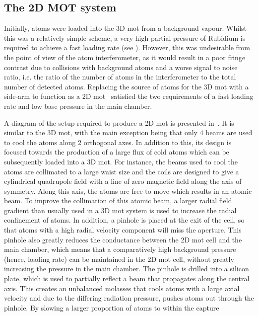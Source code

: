 \subsection{The 2D MOT system}\label{sec:2d_mot}
Initially, atoms were loaded into the 3D \ac{mot} from a background vapour.
Whilst this was a relatively simple scheme, a very high partial pressure of
Rubidium is required to achieve a fast loading rate (see
). However, this was undesirable from the
point of view of the atom interferometer, as it would result in a poor fringe
contrast due to collisions with background atoms and a worse signal to noise
ratio, i.e. the ratio of the number of atoms in the interferometer to the
total number of detected atoms. Replacing the source of atoms for the 3D
\ac{mot} with a side-arm to function as a 2D \ac{mot}~\cite{Dieckmann1998}
satisfied the two requirements of a fast loading rate and low base pressure
in the main chamber. \par\noindent
A diagram of the setup required to produce a 2D \ac{mot} is presented
in~. It is similar to the 3D \ac{mot}, with the
main exception being that only 4 beams are used to cool the atoms along 2
orthogonal axes. In addition to this, its design is focused towards the
production of a large flux of cold atoms which can be subsequently loaded
into a 3D \ac{mot}. For instance, the beams used to cool the atoms are
collimated to a large waist size and the coils are designed to give a
cylindrical quadrupole field with a line of zero magnetic field along the
axis of symmetry. Along this axis, the atoms are free to move which results
in an atomic beam. To improve the collimation of this atomic beam, a larger
radial field gradient than usually used in a 3D \ac{mot} system is used to
increase the radial confinement of atoms. In addition, a pinhole is placed at
the exit of the cell, so that atoms with a high radial velocity component
will miss the aperture. This pinhole also greatly reduces the conductance
between the 2D \ac{mot} cell and the main chamber, which means that a
comparatively high background pressure (hence, loading rate) can be
maintained in the 2D \ac{mot} cell, without greatly increasing the pressure
in the main chamber. The pinhole is drilled into a silicon plate, which is
used to partially reflect a beam that propagates along the central axis. This
creates an unbalanced molasses that cools atoms with a large axial velocity
and due to the differing radiation pressure, pushes atoms out through the
pinhole. By slowing a larger proportion of atoms to within the capture
